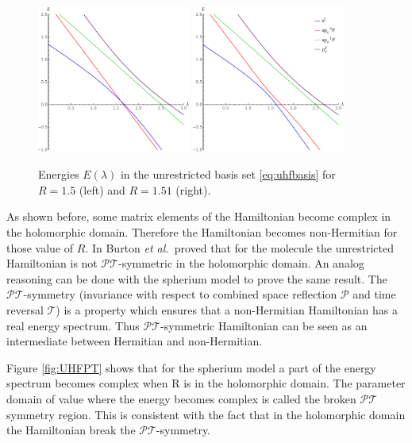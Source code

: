 \documentclass[11pt,a4paper]{article}
\newcommand{\pt}{$\mathcal{PT}$}
\begin{document}
\begin{figure}[h!]
    \centering
    \includegraphics[width=0.45\textwidth]{UHFCI.pdf}
    \includegraphics[width=0.45\textwidth]{UHFEP.pdf}
    \caption{\centering Energies $E(\lambda)$ in the unrestricted basis set \eqref{eq:uhfbasis} for $R=1.5$ (left) and $R=1.51$ (right).}
    \label{fig:UHFEP}
\end{figure}

As shown before, some matrix elements of the Hamiltonian become complex in the holomorphic domain. Therefore the Hamiltonian becomes non-Hermitian for those value of $R$. In \cite{Burton_2019a} Burton \textit{et al.}~proved that for the  molecule the unrestricted Hamiltonian is not \pt -symmetric in the holomorphic domain. An analog reasoning can be done with the spherium model to prove the same result. The \pt -symmetry (invariance with respect to combined space reflection $\mathcal{P}$ and time reversal $\mathcal{T}$) is a property which ensures that a non-Hermitian Hamiltonian has a real energy spectrum. Thus \pt -symmetric Hamiltonian can be seen as an intermediate between Hermitian and non-Hermitian.

Figure \ref{fig:UHFPT} shows that for the spherium model a part of the energy spectrum becomes complex when R is in the holomorphic domain. The parameter domain of value where the energy becomes complex is called the broken \pt symmetry  region. This is consistent with the fact that in the holomorphic domain the Hamiltonian break the \pt -symmetry. 
\end{document}
